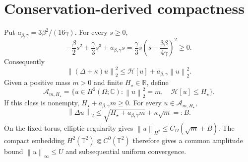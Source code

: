 \documentclass[11pt]{article}
\newcommand{\Td}{\mathbb T^2}
\newcommand{\norm}[1]{\left\|#1\right\|}
\begin{document}
\section{Conservation-derived compactness}
Put \(a_{\beta,\gamma}=3\beta^2/(16\gamma)\). For every \(s\geq0\),
\begin{equation}
\label{eq:potential}
-\frac{\beta}{2}s^2+\frac{\gamma}{3}s^3
+a_{\beta,\gamma}s
=\frac{\gamma}{3}s
\left(s-\frac{3\beta}{4\gamma}\right)^2\geq0.
\end{equation}
Consequently
\begin{equation}
\label{eq:band}
\norm{(\Delta+\kappa)u}_{2}^{2}
\leq\mathcal H[u]+a_{\beta,\gamma}\norm{u}_{2}^{2}.
\end{equation}
Given a positive mass \(m>0\) and finite \(H_\star\in\mathbb R\), define
\[
\mathcal A_{m,H_\star}=
\{u\in H^2(\Omega;\mathbb C):
\norm{u}_2^2=m,\quad\mathcal H[u]\leq H_\star\}.
\]
If this class is nonempty, \(H_\star+a_{\beta,\gamma}m\geq0\).
For every \(u\in\mathcal A_{m,H_\star}\),
\begin{equation}
\label{eq:lapbound}
\norm{\Delta u}_2
\leq\sqrt{H_\star+a_{\beta,\gamma}m}+\kappa\sqrt m=:B.
\end{equation}
On the fixed torus, elliptic regularity gives
\(\norm{u}_{H^2}\leq C_\Omega(\sqrt m+B)\).
The compact embedding \(H^2(\Td)\Subset C^0(\Td)\)
therefore gives a common amplitude bound \(\norm{u}_\infty\leq U\)
and subsequential uniform convergence.
\end{document}
